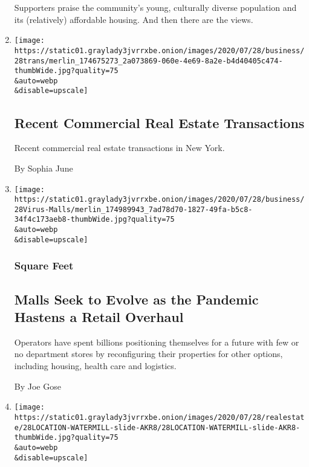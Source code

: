 \begin{enumerate}
  Supporters praise the community's young, culturally diverse population
  and its (relatively) affordable housing. And then there are the views.
\item
  \href{/2020/07/28/business/recent-commercial-real-estate-transactions.html}{}

  \texttt{[image: https://static01.graylady3jvrrxbe.onion/images/2020/07/28/business/28trans/merlin\_174675273\_2a073869-060e-4e69-8a2e-b4d40405c474-thumbWide.jpg?quality=75\\\&auto=webp\\\&disable=upscale]}

  \hypertarget{recent-commercial-real-estate-transactions}{%
  \subsection{Recent Commercial Real Estate
  Transactions}\label{recent-commercial-real-estate-transactions}}

  Recent commercial real estate transactions in New York.

  By Sophia June
\item
  \href{/2020/07/28/business/malls-coronavirus.html}{}

  \texttt{[image: https://static01.graylady3jvrrxbe.onion/images/2020/07/28/business/28Virus-Malls/merlin\_174989943\_7ad78d70-1827-49fa-b5c8-34f4c173aeb8-thumbWide.jpg?quality=75\\\&auto=webp\\\&disable=upscale]}

  \hypertarget{square-feet}{%
  \subsubsection{Square Feet}\label{square-feet}}

  \hypertarget{malls-seek-to-evolve-as-the-pandemic-hastens-a-retail-overhaul}{%
  \subsection{Malls Seek to Evolve as the Pandemic Hastens a Retail
  Overhaul}\label{malls-seek-to-evolve-as-the-pandemic-hastens-a-retail-overhaul}}

  Operators have spent billions positioning themselves for a future with
  few or no department stores by reconfiguring their properties for
  other options, including housing, health care and logistics.

  By Joe Gose
\item
  \href{/slideshow/2020/07/28/realestate/restoring-a-classic-southampton-home.html}{}

  \texttt{[image: https://static01.graylady3jvrrxbe.onion/images/2020/07/28/realestate/28LOCATION-WATERMILL-slide-AKR8/28LOCATION-WATERMILL-slide-AKR8-thumbWide.jpg?quality=75\\\&auto=webp\\\&disable=upscale]}


\end{enumerate}
